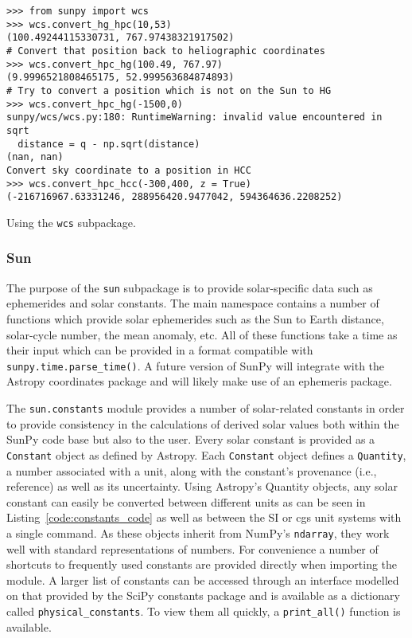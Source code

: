 \begin{listing}[H]
\begin{verbatim}
>>> from sunpy import wcs
>>> wcs.convert_hg_hpc(10,53)
(100.49244115330731, 767.97438321917502)
# Convert that position back to heliographic coordinates
>>> wcs.convert_hpc_hg(100.49, 767.97)
(9.9996521808465175, 52.999563684874893)
# Try to convert a position which is not on the Sun to HG
>>> wcs.convert_hpc_hg(-1500,0)
sunpy/wcs/wcs.py:180: RuntimeWarning: invalid value encountered in sqrt
  distance = q - np.sqrt(distance)
(nan, nan)
Convert sky coordinate to a position in HCC
>>> wcs.convert_hpc_hcc(-300,400, z = True)
(-216716967.63331246, 288956420.9477042, 594364636.2208252)
\end{verbatim}
\caption{Using the \texttt{wcs} subpackage.}
\label{code:wcs_code}
\end{listing}

\subsubsection{Sun}\label{ssec:util:sun}
The purpose of the \texttt{sun} subpackage is to provide solar-specific data such as ephemerides and
solar constants. The main namespace contains a number of functions which provide solar
ephemerides such as the Sun to Earth distance, solar-cycle number, the mean 
anomaly, etc.
All of these functions take a time as their input which can be provided in a format
compatible with \texttt{sunpy.time.parse\_time()}. 
A future version of SunPy will integrate with the Astropy coordinates package and will 
likely make use of an ephemeris package.

The \texttt{sun.constants} module provides a number of solar-related 
constants in order to provide consistency in the calculations of derived solar 
values both within the SunPy code base but also to the user. Every solar 
constant is provided as a \texttt{Constant} object as defined by Astropy. Each 
\texttt{Constant} object defines a \texttt{Quantity}, a number associated with a unit, along with 
the constant's provenance (i.e., reference) as well as its uncertainty. Using 
Astropy's {Quantity} objects, any solar constant can easily be converted between 
different units as can be seen in Listing~\ref{code:constants_code} as well
as between the SI or cgs unit systems with a single command.  As these objects inherit from 
NumPy's \texttt{ndarray}, they work well with standard representations of numbers.
For convenience a number of shortcuts to frequently used constants are provided 
directly when importing the module. A larger list of constants can be 
accessed through an interface modelled on that provided by the SciPy constants 
package and is available as a dictionary called \texttt{physical\_constants}. 
To view them all quickly, a \texttt{print\_all()} function is available.


